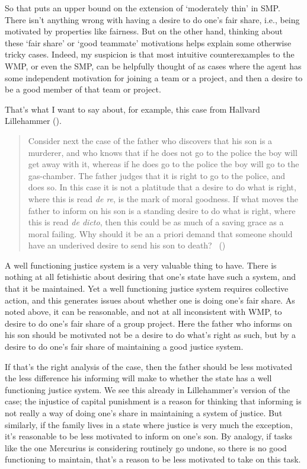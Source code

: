 \documentclass[
  10pt,
  letterpaper,
  twoside]{scrbook}
\begin{document}
So that puts an upper bound on the extension of `moderately thin' in
SMP. There isn't anything wrong with having a desire to do one's fair
share, i.e., being motivated by properties like fairness. But on the
other hand, thinking about these `fair share' or `good teammate'
motivations helps explain some otherwise tricky cases. Indeed, my
suspicion is that most intuitive counterexamples to the WMP, or even the
SMP, can be helpfully thought of as cases where the agent has some
independent motivation for joining a team or a project, and then a
desire to be a good member of that team or project.

That's what I want to say about, for example, this case from Hallvard
Lillehammer ().

\begin{quote}
Consider next the case of the father who discovers that his son is a
murderer, and who knows that if he does not go to the police the boy
will get away with it, whereas if he does go to the police the boy will
go to the gas-chamber. The father judges that it is right to go to the
police, and does so. In this case it is not a platitude that a desire to
do what is right, where this is read \emph{de re}, is the mark of moral
goodness. If what moves the father to inform on his son is a standing
desire to do what is right, where this is read \emph{de dicto}, then
this could be as much of a saving grace as a moral failing. Why should
it be an a priori demand that someone should have an underived desire to
send his son to death? ~()
\end{quote}

A well functioning justice system is a very valuable thing to have.
There is nothing at all fetishistic about desiring that one's state have
such a system, and that it be maintained. Yet a well functioning justice
system requires collective action, and this generates issues about
whether one is doing one's fair share. As noted above, it can be
reasonable, and not at all inconsistent with WMP, to desire to do one's
fair share of a group project. Here the father who informs on his son
should be motivated not be a desire to do what's right as such, but by a
desire to do one's fair share of maintaining a good justice system.

If that's the right analysis of the case, then the father should be less
motivated the less difference his informing will make to whether the
state has a well functioning justice system. We see this already in
Lillehammer's version of the case; the injustice of capital punishment
is a reason for thinking that informing is not really a way of doing
one's share in maintaining a system of justice. But similarly, if the
family lives in a state where justice is very much the exception, it's
reasonable to be less motivated to inform on one's son. By analogy, if
tasks like the one {Mercurius} is considering routinely go undone, so
there is no good functioning to maintain, that's a reason to be less
motivated to take on this task.
\end{document}
